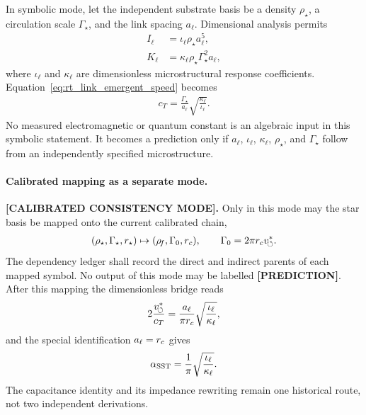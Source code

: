 In symbolic mode, let the independent substrate basis be a density
\(\rho_\star\), a circulation scale \(\Gamma_\star\), and the link spacing
\(a_\ell\).  Dimensional analysis permits
\begin{align}
    I_\ell
    &=
    \iota_\ell\rho_\star a_\ell^5,
    \\
    K_\ell
    &=
    \kappa_\ell\rho_\star\Gamma_\star^2a_\ell,
    \label{eq:rt_link_zero_legacy_coefficients}
\end{align}
where \(\iota_\ell\) and \(\kappa_\ell\) are dimensionless microstructural
response coefficients.  Equation~\eqref{eq:rt_link_emergent_speed} becomes
\begin{align}
    \boxed{
    c_T
    =
    \frac{\Gamma_\star}{a_\ell}
    \sqrt{\frac{\kappa_\ell}{\iota_\ell}}
    }.
    \label{eq:rt_link_zero_legacy_speed}
\end{align}
No measured electromagnetic or quantum constant is an algebraic input in this
symbolic statement.  It becomes a prediction only if \(a_\ell\),
\(\iota_\ell\), \(\kappa_\ell\), \(\rho_\star\), and \(\Gamma_\star\) follow
from an independently specified microstructure.

\paragraph{Calibrated mapping as a separate mode.}
\textbf{[CALIBRATED CONSISTENCY MODE].}
Only in this mode may the star basis be mapped onto the current calibrated chain,
\begin{align}
    (\rho_\star,\Gamma_\star,r_\star)
    \mapsto
    (\rho_{\!f},\Gamma_0,r_c),
    \qquad
    \Gamma_0=2\pi r_cv_{\!\boldsymbol{\circlearrowleft}}^{\ast}.
    \label{eq:rt_link_calibrated_star_mapping}
\end{align}
The dependency ledger shall record the direct and indirect parents of each
mapped symbol.  No output of this mode may be labelled \textbf{[PREDICTION]}.
After this mapping the dimensionless bridge reads
\begin{align}
    2\frac{v_{\!\boldsymbol{\circlearrowleft}}^{\ast}}{c_T}
    =
    \frac{a_\ell}{\pi r_c}
    \sqrt{\frac{\iota_\ell}{\kappa_\ell}},
    \label{eq:rt_link_alpha_route}
\end{align}
and the special identification \(a_\ell=r_c\) gives
\begin{align}
    \alpha_{\rm SST}
    =
    \frac{1}{\pi}
    \sqrt{\frac{\iota_\ell}{\kappa_\ell}}.
    \label{eq:rt_link_alpha_response_ratio}
\end{align}
The capacitance identity and its impedance rewriting remain one historical
route, not two independent derivations.


